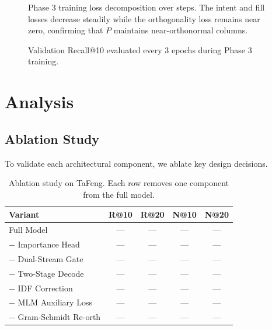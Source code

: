 \documentclass[conference]{IEEEtran}
\begin{document}

\begin{figure}[h]
\centering
\caption{Phase 3 training loss decomposition over steps. The intent and fill losses decrease steadily while the orthogonality loss remains near zero, confirming that $P$ maintains near-orthonormal columns.}
\label{fig:training_loss}
\end{figure}

\begin{figure}[h]
\centering
\caption{Validation Recall@10 evaluated every 3 epochs during Phase 3 training.}
\label{fig:val_recall}
\end{figure}


\section{Analysis}
\label{sec:analysis}

\subsection{Ablation Study}

To validate each architectural component, we ablate key design decisions.

\begin{table}[h]
\centering
\caption{Ablation study on TaFeng. Each row removes one component from the full model.}
\label{tab:ablation}
\begin{tabular}{lcccc}
\toprule
\textbf{Variant} & R@10 & R@20 & N@10 & N@20 \\
\midrule
Full Model                    & --- & --- & --- & --- \\
\midrule
$-$ Importance Head           & --- & --- & --- & --- \\
$-$ Dual-Stream Gate          & --- & --- & --- & --- \\
$-$ Two-Stage Decode          & --- & --- & --- & --- \\
$-$ IDF Correction            & --- & --- & --- & --- \\
$-$ MLM Auxiliary Loss        & --- & --- & --- & --- \\
$-$ Gram-Schmidt Re-orth      & --- & --- & --- & --- \\
\bottomrule
\end{tabular}
\end{table}
\end{document}
